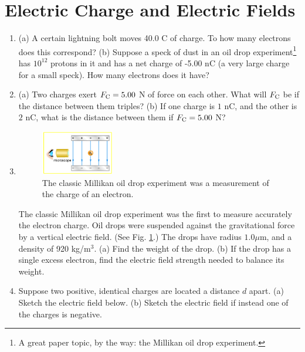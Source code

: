 \documentclass[10pt]{article}
\begin{document}
\clearpage

\section{Electric Charge and Electric Fields}

\begin{enumerate}
\item (a) A certain lightning bolt moves 40.0 C of charge.  To how many electrons does this correspond? (b) Suppose a speck of dust in an oil drop experiment\footnote{A great paper topic, by the way: the Millikan oil drop experiment.} has  $10^{12}$  protons in it and has a net charge of -5.00 nC (a very large charge for a small speck). How many electrons does it have?\\ \vspace{1cm}
\item (a) Two charges exert $F_{\rm C} = 5.00$ N of force on each other. What will $F_{\rm C}$ be if the distance between them triples? (b) If one charge is $1$ nC, and the other is $2$ nC, what is the distance between them if $F_{\rm C} = 5.00$ N? \\ \vspace{1cm}
\item 
\begin{figure}
\centering
\includegraphics[width=0.3\textwidth]{mill.jpeg}
\caption{\label{fig:mill} The classic Millikan oil drop experiment was a measurement of the charge of an electron.}
\end{figure}
The classic Millikan oil drop experiment was the first to measure accurately the electron charge. Oil drops were suspended against the gravitational force by a vertical electric field. (See Fig. \ref{fig:mill}.) The drops have radius $1.0 \mu$m, and a density of 920 kg/m$^3$. (a) Find the weight of the drop. (b) If the drop has a single excess electron, find the electric field strength needed to balance its weight. \\ \vspace{1.75cm}
\item Suppose two positive, identical charges are located a distance $d$ apart. (a) Sketch the electric field below.  (b) Sketch the electric field if instead one of the charges is negative. \\ \vspace{2.5cm}

\end{enumerate}
\end{document}
